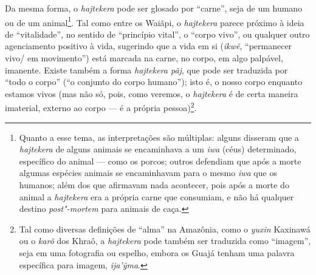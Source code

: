Da mesma forma, o \emph{hajtekera} pode ser glosado por ``carne'', seja de
um humano ou de um animal\footnote{Quanto a esse tema, as interpretações
  são múltiplas: alguns disseram que a \emph{hajtekera} de alguns
  animais se encaminhava a um \emph{iwa} (céus) determinado, específico
  do animal --- como os porcos; outros defendiam que após a morte algumas
  espécies animais se encaminhavam para o mesmo \emph{iwa} que os
  humanos; além dos que afirmavam nada acontecer, pois após a morte do
  animal a \emph{hajtekera} era a própria carne que consumiam, e não há
  qualquer destino \emph{post"-mortem} para animais de caça.}. Tal como
entre os Waiãpi, o \emph{hajtekera} parece próximo à ideia de
``vitalidade'', no sentido de ``princípio vital'', o ``corpo vivo'', ou
qualquer outro agenciamento positivo à vida, sugerindo que a vida em si
(\emph{ikwẽ}, ``permanecer vivo/ em movimento'') está marcada na carne, no
corpo, em algo palpável, imanente. Existe também a forma \emph{hajtekera
pãj}, que pode ser traduzida por ``todo o corpo'' (``o conjunto do corpo
humano''); isto é, o nosso corpo enquanto estamos vivos (mas não só,
pois, como veremos, o \emph{hajtekera} é de certa maneira imaterial,
externo ao corpo --- é a própria pessoa)\footnote{Tal como diversas
  definições de ``alma'' na Amazônia, como o \emph{yuxin} Kaxinawá ou o
  \emph{karõ} dos Khraô, a \emph{hajtekera} pode também ser traduzida
  como ``imagem'', seja em uma fotografia ou espelho, embora os Guajá
  tenham uma palavra específica para imagem, \emph{ija'ỹma}.}.

